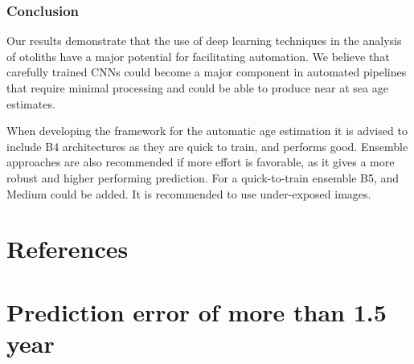 \documentclass[10pt,letterpaper]{article}
\begin{document}
\subsubsection*{Conclusion}
Our results demonstrate that the use of deep learning techniques in the analysis of otoliths have a major potential for facilitating automation. We believe that carefully trained CNNs could become a major component in automated pipelines that require minimal processing and could be able to produce near at sea age estimates.

When developing the framework for the automatic age estimation it is advised to 
include B4 architectures as they are quick to train, and performs good. Ensemble approaches are also recommended if more effort is favorable, as it gives a more robust and higher performing prediction. For a quick-to-train ensemble B5, and Medium could be added. It is recommended to use under-exposed images.

\section*{References}




\pagebreak

\appendix
\section{Prediction error of more than 1.5 year}
\end{document}
